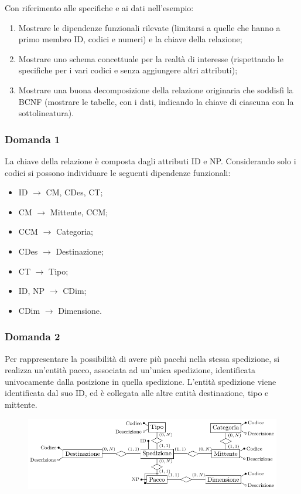 \documentclass{article}
\begin{document}
Con riferimento alle specifiche e ai dati nell'esempio:
\begin{enumerate}
    \item Mostrare le dipendenze funzionali rilevate (limitarsi a quelle che hanno a primo membro ID, codici e
    numeri) e la chiave della relazione;
    \item Mostrare uno schema concettuale per la realtà di interesse (rispettando le specifiche per i vari codici e
    senza aggiungere altri attributi);
    \item Mostrare una buona decomposizione della relazione originaria che soddisfi la BCNF (mostrare le tabelle,
    con i dati, indicando la chiave di ciascuna con la sottolineatura).    
\end{enumerate}

\subsubsection*{Domanda 1}

La chiave della relazione è composta dagli attributi ID e NP. Considerando solo i codici si possono individuare le seguenti dipendenze funzionali:
\begin{itemize}
    \item ID $\to$ CM, CDes, CT;
    \item CM $\to$ Mittente, CCM;
    \item CCM $\to$ Categoria;
    \item CDes $\to$ Destinazione;
    \item CT $\to$ Tipo;
    \item ID, NP $\to$ CDim;
    \item CDim $\to$ Dimensione.
\end{itemize}

\subsubsection*{Domanda 2}

Per rappresentare la possibilità di avere più pacchi nella stessa spedizione, si realizza un'entità pacco, associata ad un'unica spedizione, identificata univocamente dalla posizione in quella spedizione. L'entità spedizione viene identificata dal suo ID, ed è collegata alle altre entità destinazione, tipo e mittente. 

\begin{figure}[H]%
    \centering%
    \includegraphics{schema_3_13-12-24.pdf}%
\end{figure}
\end{document}
